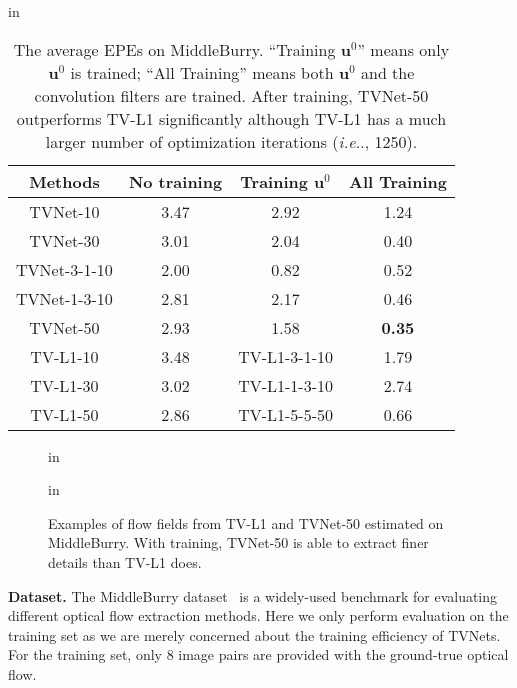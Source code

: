 \documentclass[10pt,twocolumn,letterpaper]{article}
\makeatletter
\DeclareRobustCommand\onedot{\futurelet\@let@token\@onedot}
\def\@onedot{\ifx\@let@token.\else.\null\fi\xspace}
\def\ie{\emph{i.e}\onedot} \def\Ie{\emph{I.e}\onedot}
\def\Vec#1{{\boldsymbol{#1}}}
\makeatother
\begin{document}
\begin{table}[t!]
 in
\centering
\caption{The average EPEs on MiddleBurry. ``Training $\Vec{u}^0$'' means only $\Vec{u}^0$ is trained; ``All Training'' means both $\Vec{u}^0$ and the convolution filters are trained. After training, TVNet-50 outperforms TV-L1 significantly although TV-L1 has a much larger number of optimization iterations (\ie, 1250).}
\label{Tab:vs-tvl1}
\tabcolsep 4pt \renewcommand{\arraystretch}{0.8}
\begin{tabular}{c|c|c|c}
\toprule
Methods         & No training & Training $\Vec{u}^0$ & All Training \\
\hline
TVNet-10        & 3.47  & 2.92  &  1.24   \\
TVNet-30        & 3.01  & 2.04  &  0.40  \\
TVNet-3-1-10    & 2.00  & 0.82  &  0.52 \\
TVNet-1-3-10    & 2.81  & 2.17  &  0.46   \\
TVNet-50        & 2.93  & 1.58  &  \textbf{0.35}    \\
\toprule
\toprule
TV-L1-10   & 3.48   &  TV-L1-3-1-10    & 1.79        \\
TV-L1-30   & 3.02   &  TV-L1-1-3-10    & 2.74     \\
TV-L1-50   & 2.86   &  TV-L1-5-5-50    & 0.66   \\
\bottomrule
\end{tabular}
\vskip -0.05in
\end{table}



\begin{figure}[t!]
 in
\begin{center}
 in
\caption{Examples of flow fields from TV-L1 and TVNet-50 estimated on MiddleBurry. With training, TVNet-50 is able to
extract finer details than TV-L1 does.}
\label{Fig:flow}
\end{center}
\end{figure}


\textbf{Dataset.}
The MiddleBurry dataset~\cite{baker2011database} is a widely-used benchmark for evaluating different optical flow extraction methods.
Here we only perform evaluation on the training set as we are merely concerned about the training efficiency of TVNets.
For the training set, only 8 image pairs are provided with the ground-true optical flow.
\end{document}
